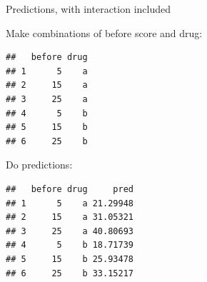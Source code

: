 \begin{frame}[fragile]{Predictions, with interaction included}


  
  \begin{multicols}{2}
    

  
  Make combinations of before score and drug:
  
\begin{knitrout}
\color{fgcolor}\begin{kframe}
\begin{alltt}
\hlkwb{=}\hlstd{(}
      \hlstd{=}\hlstd{(}\hlstd{,}\hlstd{,}\hlstd{),}
      \hlstd{=}\hlstd{(}\hlstd{,}\hlstd{)}
               \hlstd{)}
\end{alltt}
\begin{verbatim}
##   before drug
## 1      5    a
## 2     15    a
## 3     25    a
## 4      5    b
## 5     15    b
## 6     25    b
\end{verbatim}
\end{kframe}
\end{knitrout}

Do predictions:

\begin{knitrout}
\color{fgcolor}\begin{kframe}
\begin{alltt}
\hlkwb{=}
\hlkwb{=}
\end{alltt}
\begin{verbatim}
##   before drug     pred
## 1      5    a 21.29948
## 2     15    a 31.05321
## 3     25    a 40.80693
## 4      5    b 18.71739
## 5     15    b 25.93478
## 6     25    b 33.15217
\end{verbatim}
\end{kframe}
\end{knitrout}
  
  \end{multicols}

\end{frame}

